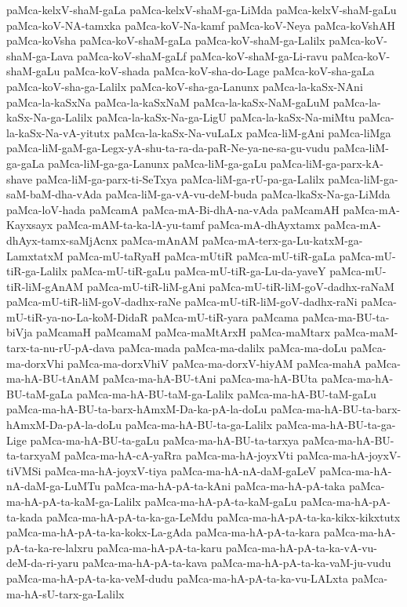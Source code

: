 {paMca-kelxV-shaM-gaLa
paMca-kelxV-shaM-ga-LiMda
paMca-kelxV-shaM-gaLu
paMca-koV-NA-tamxka
paMca-koV-Na-kamf
paMca-koV-Neya
paMca-koVshAH
paMca-koVsha
paMca-koV-shaM-gaLa
paMca-koV-shaM-ga-Lalilx
paMca-koV-shaM-ga-Lava
paMca-koV-shaM-gaLf
paMca-koV-shaM-ga-Li-ravu
paMca-koV-shaM-gaLu
paMca-koV-shada
paMca-koV-sha-do-Lage
paMca-koV-sha-gaLa
paMca-koV-sha-ga-Lalilx
paMca-koV-sha-ga-Lanunx
paMca-la-kaSx-NAni
paMca-la-kaSxNa
paMca-la-kaSxNaM
paMca-la-kaSx-NaM-gaLuM
paMca-la-kaSx-Na-ga-Lalilx
paMca-la-kaSx-Na-ga-LigU
paMca-la-kaSx-Na-miMtu
paMca-la-kaSx-Na-vA-yitutx
paMca-la-kaSx-Na-vuLaLx
paMca-liM-gAni
paMca-liMga
paMca-liM-gaM-ga-Legx-yA-shu-ta-ra-da-paR-Ne-ya-ne-sa-gu-vudu
paMca-liM-ga-gaLa
paMca-liM-ga-ga-Lanunx
paMca-liM-ga-gaLu
paMca-liM-ga-parx-kA-shave
paMca-liM-ga-parx-ti-SeTxya
paMca-liM-ga-rU-pa-ga-Lalilx
paMca-liM-ga-saM-baM-dha-vAda
paMca-liM-ga-vA-vu-deM-buda
paMca-lkaSx-Na-ga-LiMda
paMca-loV-hada
paMcamA
paMca-mA-Bi-dhA-na-vAda
paMcamAH
paMca-mA-Kayxsayx
paMca-mAM-ta-ka-lA-yu-tamf
paMca-mA-dhAyxtamx
paMca-mA-dhAyx-tamx-saMjAcnx
paMca-mAnAM
paMca-mA-terx-ga-Lu-katxM-ga-LamxtatxM
paMca-mU-taRyaH
paMca-mUtiR
paMca-mU-tiR-gaLa
paMca-mU-tiR-ga-Lalilx
paMca-mU-tiR-gaLu
paMca-mU-tiR-ga-Lu-da-yaveY
paMca-mU-tiR-liM-gAnAM
paMca-mU-tiR-liM-gAni
paMca-mU-tiR-liM-goV-dadhx-raNaM
paMca-mU-tiR-liM-goV-dadhx-raNe
paMca-mU-tiR-liM-goV-dadhx-raNi
paMca-mU-tiR-ya-no-La-koM-DidaR
paMca-mU-tiR-yara
paMcama
paMca-ma-BU-ta-biVja
paMcamaH
paMcamaM
paMca-maMtArxH
paMca-maMtarx
paMca-maM-tarx-ta-nu-rU-pA-dava
paMca-mada
paMca-ma-dalilx
paMca-ma-doLu
paMca-ma-dorxVhi
paMca-ma-dorxVhiV
paMca-ma-dorxV-hiyAM
paMca-mahA
paMca-ma-hA-BU-tAnAM
paMca-ma-hA-BU-tAni
paMca-ma-hA-BUta
paMca-ma-hA-BU-taM-gaLa
paMca-ma-hA-BU-taM-ga-Lalilx
paMca-ma-hA-BU-taM-gaLu
paMca-ma-hA-BU-ta-barx-hAmxM-Da-ka-pA-la-doLu
paMca-ma-hA-BU-ta-barx-hAmxM-Da-pA-la-doLu
paMca-ma-hA-BU-ta-ga-Lalilx
paMca-ma-hA-BU-ta-ga-Lige
paMca-ma-hA-BU-ta-gaLu
paMca-ma-hA-BU-ta-tarxya
paMca-ma-hA-BU-ta-tarxyaM
paMca-ma-hA-cA-yaRra
paMca-ma-hA-joyxVti
paMca-ma-hA-joyxV-tiVMSi
paMca-ma-hA-joyxV-tiya
paMca-ma-hA-nA-daM-gaLeV
paMca-ma-hA-nA-daM-ga-LuMTu
paMca-ma-hA-pA-ta-kAni
paMca-ma-hA-pA-taka
paMca-ma-hA-pA-ta-kaM-ga-Lalilx
paMca-ma-hA-pA-ta-kaM-gaLu
paMca-ma-hA-pA-ta-kada
paMca-ma-hA-pA-ta-ka-ga-LeMdu
paMca-ma-hA-pA-ta-ka-kikx-kikxtutx
paMca-ma-hA-pA-ta-ka-kokx-La-gAda
paMca-ma-hA-pA-ta-kara
paMca-ma-hA-pA-ta-ka-re-lalxru
paMca-ma-hA-pA-ta-karu
paMca-ma-hA-pA-ta-ka-vA-vu-deM-da-ri-yaru
paMca-ma-hA-pA-ta-kava
paMca-ma-hA-pA-ta-ka-vaM-ju-vudu
paMca-ma-hA-pA-ta-ka-veM-dudu
paMca-ma-hA-pA-ta-ka-vu-LALxta
paMca-ma-hA-sU-tarx-ga-Lalilx
}
